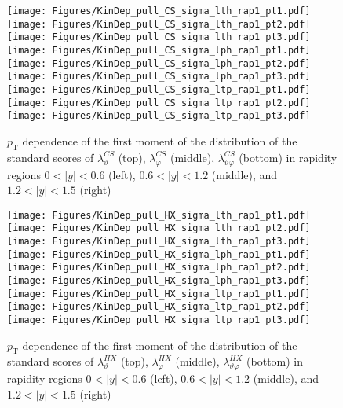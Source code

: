 \documentclass[12pt]{article}
\newcommand{\pT}{p_\mathrm{T}}
\newcommand{\absy}{\left |  y \right |}
\newcommand{\lamthCS}{\lambda^{\scriptscriptstyle CS}_\vartheta}
\newcommand{\lamphCS}{\lambda^{\scriptscriptstyle CS}_\varphi}
\newcommand{\lamthphCS}{\lambda^{\scriptscriptstyle CS}_{\vartheta \varphi}}
\newcommand{\lamthHX}{\lambda^{\scriptscriptstyle HX}_\vartheta}
\newcommand{\lamphHX}{\lambda^{\scriptscriptstyle HX}_\varphi}
\newcommand{\lamthphHX}{\lambda^{\scriptscriptstyle HX}_{\vartheta \varphi}}
\begin{document}
\begin{figure}[htbp]
\centering
\texttt{[image: Figures/KinDep\_pull\_CS\_sigma\_lth\_rap1\_pt1.pdf]}
\texttt{[image: Figures/KinDep\_pull\_CS\_sigma\_lth\_rap1\_pt2.pdf]}
\texttt{[image: Figures/KinDep\_pull\_CS\_sigma\_lth\_rap1\_pt3.pdf]}
\texttt{[image: Figures/KinDep\_pull\_CS\_sigma\_lph\_rap1\_pt1.pdf]}
\texttt{[image: Figures/KinDep\_pull\_CS\_sigma\_lph\_rap1\_pt2.pdf]}
\texttt{[image: Figures/KinDep\_pull\_CS\_sigma\_lph\_rap1\_pt3.pdf]}
\texttt{[image: Figures/KinDep\_pull\_CS\_sigma\_ltp\_rap1\_pt1.pdf]}
\texttt{[image: Figures/KinDep\_pull\_CS\_sigma\_ltp\_rap1\_pt2.pdf]}
\texttt{[image: Figures/KinDep\_pull\_CS\_sigma\_ltp\_rap1\_pt3.pdf]}
\caption{$\pT$ dependence of the first moment of the distribution of the
standard scores of $\lamthCS$ (top), $\lamphCS$ (middle), $\lamthphCS$ (bottom) in rapidity
regions $0<\absy<0.6$ (left), $0.6<\absy<1.2$ (middle), and $1.2<\absy<1.5$ (right)}
\end{figure}
\clearpage

\begin{figure}[htbp]
\centering
\texttt{[image: Figures/KinDep\_pull\_HX\_sigma\_lth\_rap1\_pt1.pdf]}
\texttt{[image: Figures/KinDep\_pull\_HX\_sigma\_lth\_rap1\_pt2.pdf]}
\texttt{[image: Figures/KinDep\_pull\_HX\_sigma\_lth\_rap1\_pt3.pdf]}
\texttt{[image: Figures/KinDep\_pull\_HX\_sigma\_lph\_rap1\_pt1.pdf]}
\texttt{[image: Figures/KinDep\_pull\_HX\_sigma\_lph\_rap1\_pt2.pdf]}
\texttt{[image: Figures/KinDep\_pull\_HX\_sigma\_lph\_rap1\_pt3.pdf]}
\texttt{[image: Figures/KinDep\_pull\_HX\_sigma\_ltp\_rap1\_pt1.pdf]}
\texttt{[image: Figures/KinDep\_pull\_HX\_sigma\_ltp\_rap1\_pt2.pdf]}
\texttt{[image: Figures/KinDep\_pull\_HX\_sigma\_ltp\_rap1\_pt3.pdf]}
\caption{$\pT$ dependence of the first moment of the distribution of the
standard scores of $\lamthHX$ (top), $\lamphHX$ (middle), $\lamthphHX$ (bottom) in rapidity
regions $0<\absy<0.6$ (left), $0.6<\absy<1.2$ (middle), and $1.2<\absy<1.5$ (right)}
\end{figure}
\clearpage
\end{document}
